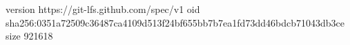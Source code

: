 version https://git-lfs.github.com/spec/v1
oid sha256:0351a72509c36487ca4109d513f24bf655bb7b7ea1fd73dd46bdcb71043db3ce
size 921618
